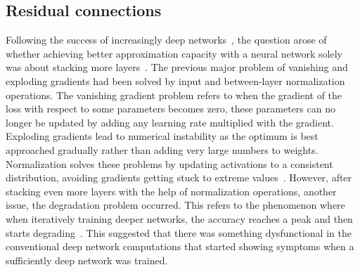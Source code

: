 \documentclass[english,twoside,openright]{UH_DS_MSc}
\begin{document}
\subsection{Residual connections}

Following the success of increasingly deep networks~\cite{vgg,googlelenet}, the question arose of whether 
achieving better approximation capacity with a neural network solely was about stacking more layers~\cite{resnet}.
The previous major problem of vanishing and exploding gradients had been solved by input and between-layer 
normalization operations. The vanishing gradient problem refers to when the gradient of the loss with respect to 
some parameters becomes zero, these parameters can no longer be updated by adding any learning rate multiplied with the gradient. Exploding 
gradients lead to numerical instability as the optimum is best approached gradually rather than adding very large numbers to weights. Normalization solves these problems by updating activations to a consistent distribution, avoiding gradients getting stuck to extreme values~\cite{batchnorm}.
However, after stacking even more layers with the help of normalization operations, another issue, the degradation 
problem occurred. This refers to the phenomenon where when iteratively training deeper networks, the accuracy 
reaches a peak and then starts degrading~\cite{resnet}. This suggested that there was something dysfunctional in 
the conventional deep network computations that started showing symptoms when a sufficiently deep network was trained.
\end{document}
